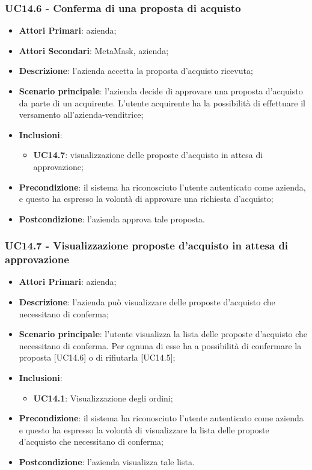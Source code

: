 \subsubsection{UC14.6 - Conferma di una proposta di acquisto}
\begin{itemize}
	\item \textbf{Attori Primari}: azienda;
	\item \textbf{Attori Secondari}: MetaMask\glo, azienda;
	\item \textbf{Descrizione}: l'azienda accetta la proposta d'acquisto ricevuta;
	\item \textbf{Scenario principale}: l'azienda decide di approvare una proposta d'acquisto da parte di un acquirente. L'utente acquirente ha la possibilità di effettuare il versamento all'azienda-venditrice;
		\item \textbf{Inclusioni}: 
	\begin{itemize}
		\item \textbf{UC14.7}: visualizzazione delle proposte d'acquisto in attesa di approvazione;
	\end{itemize}
	\item \textbf{Precondizione}: il sistema ha riconosciuto l'utente autenticato come azienda, e questo ha espresso la volontà di approvare una richiesta d'acquisto;
	\item \textbf{Postcondizione}: l'azienda approva tale proposta.
\end{itemize}


\subsubsection{UC14.7 - Visualizzazione proposte d'acquisto in attesa di approvazione}
\begin{itemize}
	\item \textbf{Attori Primari}: azienda;
	\item \textbf{Descrizione}: l'azienda può visualizzare delle proposte d'acquisto che necessitano di conferma;
	\item \textbf{Scenario principale}: l'utente visualizza la lista delle proposte d'acquisto che necessitano di conferma. Per ognuna di esse ha a possibilità di confermare la proposta [UC14.6] o di rifiutarla [UC14.5];
		\item \textbf{Inclusioni}:
	\begin{itemize}
		\item \textbf{UC14.1}: Visualizzazione degli ordini;
	\end{itemize}
	\item \textbf{Precondizione}: il sistema ha riconosciuto l'utente autenticato come azienda e questo ha espresso la volontà di visualizzare la lista delle proposte d'acquisto che necessitano di conferma;
	\item \textbf{Postcondizione}: l'azienda visualizza tale lista.
\end{itemize}






